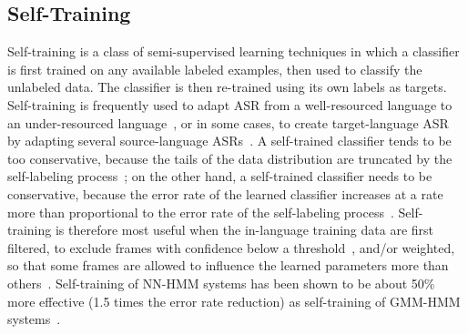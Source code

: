 
\subsection{Self-Training}

Self-training is a class of semi-supervised learning techniques in
which a classifier is first trained on any available labeled examples,
then used to classify the unlabeled data.  The classifier is then
re-trained using its own labels as targets.  Self-training is
frequently used to adapt ASR from a well-resourced language to an
under-resourced language~\cite{Loof2009,Cetin2008}, or in some cases,
to create target-language ASR by adapting several source-language
ASRs~\cite{Vu2011b}.  A self-trained classifier tends to be too
conservative, because the tails of the data distribution are truncated
by the self-labeling process~\cite{Scudder1965}; on the other hand, a
self-trained classifier needs to be conservative, because the error
rate of the learned classifier increases at a rate more than
proportional to the error rate of the self-labeling
process~\cite{Huang2013b}.  Self-training is therefore most useful
when the in-language training data are first filtered, to exclude
frames with confidence below a threshold~\cite{vesely2013-semi},
and/or weighted, so that some frames are allowed to influence the
learned parameters more than others~\cite{Hsiao2013}.  Self-training
of NN-HMM systems has been shown to be about 50\% more effective (1.5
times the error rate reduction) as self-training of GMM-HMM
systems~\cite{Huang2013b}.
